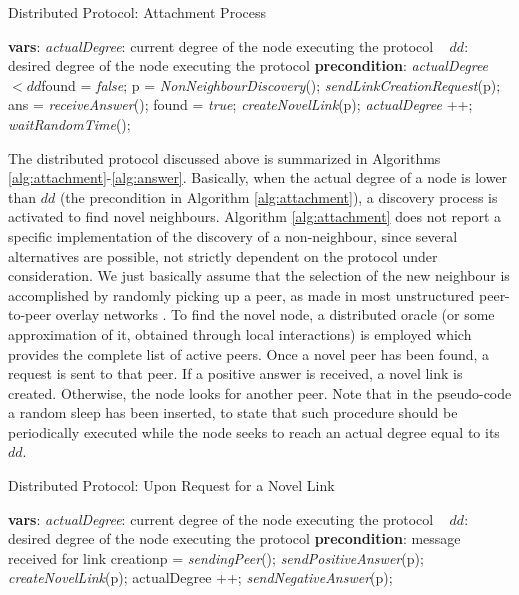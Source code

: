 \documentclass[a4paper,twosided]{article}
\begin{document}
\begin{algorithm}[t]
\caption{Distributed Protocol: Attachment Process} 
\label{alg:attachment}
\begin{algorithmic}
\STATE \textbf{vars}: \textit{actualDegree}: current degree of the node executing the protocol
\STATE \qquad \mbox{   } $dd$: desired degree of the node executing the protocol
\STATE \STATE \textbf{precondition}: \textit{actualDegree} $< dd$\STATE \STATE found = \textit{false};
\STATE p = \textit{NonNeighbourDiscovery}(); \STATE \textit{sendLinkCreationRequest}(p);
  \STATE ans = \textit{receiveAnswer}();
    \STATE found = \textit{true};
    \STATE \textit{createNovelLink}(p);
    \STATE \textit{actualDegree} ++;
  \ENDIF
\ENDWHILE
\STATE \textit{waitRandomTime}();
\end{algorithmic}
\end{algorithm}

The distributed protocol discussed above is summarized in Algorithms \ref{alg:attachment}-\ref{alg:answer}. Basically, when the actual degree of a node is lower than $dd$ (the precondition in Algorithm \ref{alg:attachment}), a discovery process is activated to find novel neighbours. Algorithm \ref{alg:attachment} does not report a specific implementation of the discovery of a non-neighbour, since several alternatives are possible, not strictly dependent on the protocol under consideration. 
We just basically assume that the selection of the new neighbour is accomplished by randomly picking up a peer, as made in most unstructured peer-to-peer overlay networks \cite{guclu,HaridasanvanRenesse08,keidar,linlin,Qi}. 
To find the novel node, a distributed oracle (or some approximation of it, obtained through local interactions) is employed which provides the complete list of active peers. 
Once a novel peer has been found, a request is sent to that peer. If a positive answer is received, a novel link is created. Otherwise, the node looks for another peer. Note that in the pseudo-code a random sleep has been inserted, to state that such procedure should be periodically executed while the node seeks to reach an actual degree equal to its $dd$.

\begin{algorithm}[t]
\caption{Distributed Protocol: Upon Request for a Novel Link} 
\label{alg:answer}
\begin{algorithmic}
\STATE \textbf{vars}: \textit{actualDegree}: current degree of the node executing the protocol
\STATE \qquad \mbox{   } $dd$: desired degree of the node executing the protocol
\STATE \STATE \textbf{precondition}: message received for link creation\STATE \STATE p = \textit{sendingPeer}(); 
  \STATE \textit{sendPositiveAnswer}(p);
  \STATE \textit{createNovelLink}(p);
  \STATE actualDegree ++;
\ELSE
  \STATE \textit{sendNegativeAnswer}(p);
\ENDIF
\end{algorithmic}
\end{algorithm}
\end{document}
